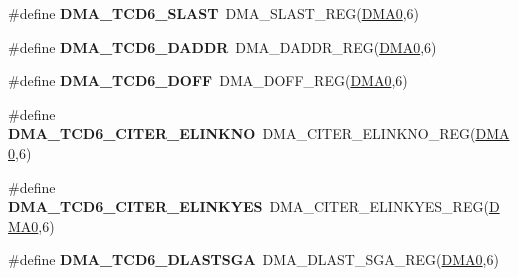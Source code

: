 \begin{DoxyCompactItemize}
\item 
\#define {\bfseries D\+M\+A\+\_\+\+T\+C\+D6\+\_\+\+S\+L\+A\+ST}~D\+M\+A\+\_\+\+S\+L\+A\+S\+T\+\_\+\+R\+EG(\hyperlink{group__DMA__Peripheral__Access__Layer_ga4103044f9ca209772f513dc694513ffb}{D\+M\+A0},6)\hypertarget{group__DMA__Register__Accessor__Macros_ga672ec28af0a73ea4d68fd67e1c00c2cf}{}\label{group__DMA__Register__Accessor__Macros_ga672ec28af0a73ea4d68fd67e1c00c2cf}

\item 
\#define {\bfseries D\+M\+A\+\_\+\+T\+C\+D6\+\_\+\+D\+A\+D\+DR}~D\+M\+A\+\_\+\+D\+A\+D\+D\+R\+\_\+\+R\+EG(\hyperlink{group__DMA__Peripheral__Access__Layer_ga4103044f9ca209772f513dc694513ffb}{D\+M\+A0},6)\hypertarget{group__DMA__Register__Accessor__Macros_ga48867e3ab689be488624b105f0096275}{}\label{group__DMA__Register__Accessor__Macros_ga48867e3ab689be488624b105f0096275}

\item 
\#define {\bfseries D\+M\+A\+\_\+\+T\+C\+D6\+\_\+\+D\+O\+FF}~D\+M\+A\+\_\+\+D\+O\+F\+F\+\_\+\+R\+EG(\hyperlink{group__DMA__Peripheral__Access__Layer_ga4103044f9ca209772f513dc694513ffb}{D\+M\+A0},6)\hypertarget{group__DMA__Register__Accessor__Macros_ga4e5f76022fb322b6ad46f22afc87d44c}{}\label{group__DMA__Register__Accessor__Macros_ga4e5f76022fb322b6ad46f22afc87d44c}

\item 
\#define {\bfseries D\+M\+A\+\_\+\+T\+C\+D6\+\_\+\+C\+I\+T\+E\+R\+\_\+\+E\+L\+I\+N\+K\+NO}~D\+M\+A\+\_\+\+C\+I\+T\+E\+R\+\_\+\+E\+L\+I\+N\+K\+N\+O\+\_\+\+R\+EG(\hyperlink{group__DMA__Peripheral__Access__Layer_ga4103044f9ca209772f513dc694513ffb}{D\+M\+A0},6)\hypertarget{group__DMA__Register__Accessor__Macros_gae0ec616b075a507b1d33d7783bd9e5a1}{}\label{group__DMA__Register__Accessor__Macros_gae0ec616b075a507b1d33d7783bd9e5a1}

\item 
\#define {\bfseries D\+M\+A\+\_\+\+T\+C\+D6\+\_\+\+C\+I\+T\+E\+R\+\_\+\+E\+L\+I\+N\+K\+Y\+ES}~D\+M\+A\+\_\+\+C\+I\+T\+E\+R\+\_\+\+E\+L\+I\+N\+K\+Y\+E\+S\+\_\+\+R\+EG(\hyperlink{group__DMA__Peripheral__Access__Layer_ga4103044f9ca209772f513dc694513ffb}{D\+M\+A0},6)\hypertarget{group__DMA__Register__Accessor__Macros_ga3e433ef28a7aafd62a976c1537b586a1}{}\label{group__DMA__Register__Accessor__Macros_ga3e433ef28a7aafd62a976c1537b586a1}

\item 
\#define {\bfseries D\+M\+A\+\_\+\+T\+C\+D6\+\_\+\+D\+L\+A\+S\+T\+S\+GA}~D\+M\+A\+\_\+\+D\+L\+A\+S\+T\+\_\+\+S\+G\+A\+\_\+\+R\+EG(\hyperlink{group__DMA__Peripheral__Access__Layer_ga4103044f9ca209772f513dc694513ffb}{D\+M\+A0},6)\hypertarget{group__DMA__Register__Accessor__Macros_ga462831fecef10ad2b3be07101cc4a0cb}{}\label{group__DMA__Register__Accessor__Macros_ga462831fecef10ad2b3be07101cc4a0cb}


\end{DoxyCompactItemize}
